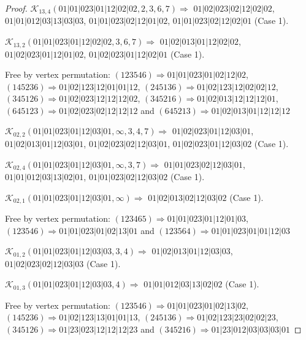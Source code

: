 \documentclass[12pt]{article}
\theoremstyle{plain}
\theoremstyle{definition}
\theoremstyle{remark}
\newcommand{\fancy}[1]{\mathcal{#1}}
\def\K{\fancy{K}}
\begin{document}
\begin{proof}
	
	
	\bigskip
	
	$\K_{13,4}(01|01|023|01|12|02|02,2, 3, 6, 7)\Rightarrow $ $01|02|023|02|12|02|02$, $01|01|012|03|13|03|03$, $01|01|023|02|12|01|02$, $01|01|023|02|12|02|01$ (Case 1).
	
	$\K_{13,2}(01|01|023|01|12|02|02,3, 6, 7)\Rightarrow $ $01|02|013|01|12|02|02$, $01|02|023|01|12|01|02$, $01|02|023|01|12|02|01$ (Case 1).
	
	
	
	Free by vertex permutation: $(1 2 3 5 4 6)\Rightarrow 01|01|023|01|02|12|02$, $(1 4 5 2 3 6)\Rightarrow 01|02|123|12|01|01|12$, $(2 4 5 1 3 6)\Rightarrow 01|02|123|12|02|02|12$, $(3 4 5 1 2 6)\Rightarrow 01|02|023|12|12|12|02$, $(3 4 5 2 1 6)\Rightarrow 01|02|013|12|12|12|01$, $(6 4 5 1 2 3)\Rightarrow 01|02|023|02|12|12|12$ and $(6 4 5 2 1 3)\Rightarrow 01|02|013|01|12|12|12$
	
	
	
	\bigskip
	
	$\K_{02,2}(01|01|023|01|12|03|01,\infty,3, 4, 7)\Rightarrow $ $01|02|023|01|12|03|01$, $01|02|013|01|12|03|01$, $01|02|023|02|12|03|01$, $01|02|023|01|12|03|02$ (Case 1).
	
	$\K_{02,4}(01|01|023|01|12|03|01,\infty,3, 7)\Rightarrow $ $01|01|023|02|12|03|01$, $01|01|012|03|13|02|01$, $01|01|023|02|12|03|02$ (Case 1).
	
	$\K_{02,1}(01|01|023|01|12|03|01,\infty)\Rightarrow $ $01|02|013|02|12|03|02$ (Case 1).
	
	
	
	Free by vertex permutation: $(1 2 3 4 6 5)\Rightarrow 01|01|023|01|12|01|03$, $(1 2 3 5 4 6)\Rightarrow 01|01|023|01|02|13|01$ and $(1 2 3 5 6 4)\Rightarrow 01|01|023|01|01|12|03$
	
	
	
	\bigskip
	
	$\K_{01,2}(01|01|023|01|12|03|03,3, 4)\Rightarrow $ $01|02|013|01|12|03|03$, $01|02|023|02|12|03|03$ (Case 1).
	
	$\K_{01,3}(01|01|023|01|12|03|03,4)\Rightarrow $ $01|01|012|03|13|02|02$ (Case 1).
	
	
	
	Free by vertex permutation: $(1 2 3 5 4 6)\Rightarrow 01|01|023|01|02|13|02$, $(1 4 5 2 3 6)\Rightarrow 01|02|123|13|01|01|13$, $(2 4 5 1 3 6)\Rightarrow 01|02|123|23|02|02|23$, $(3 4 5 1 2 6)\Rightarrow 01|23|023|12|12|12|23$ and $(3 4 5 2 1 6)\Rightarrow 01|23|012|03|03|03|01$
	
	
	

\end{proof}
\end{document}
